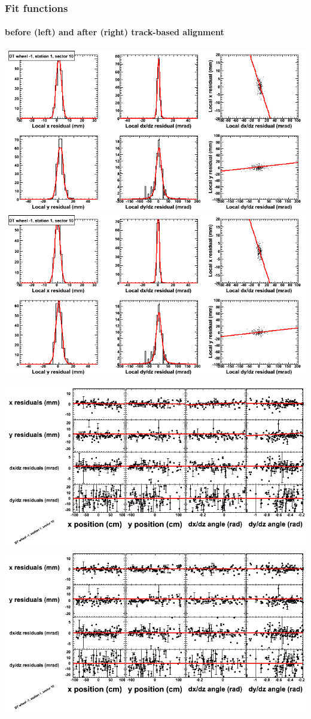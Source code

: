 \documentclass[compress]{beamer}
\begin{document}
\begin{frame}
\frametitle{Fit functions}
\framesubtitle{before (left) and after (right) track-based alignment}
\includegraphics[width=0.5\linewidth]{fitfunctions_re01/MBwhBst1sec10_bellcurves.png} \includegraphics[width=0.5\linewidth]{fitfunctions_re05/MBwhBst1sec10_bellcurves.png}

\includegraphics[width=0.5\linewidth]{fitfunctions_re01/MBwhBst1sec10_polynomials.png} \includegraphics[width=0.5\linewidth]{fitfunctions_re05/MBwhBst1sec10_polynomials.png}
\end{frame}
\end{document}
